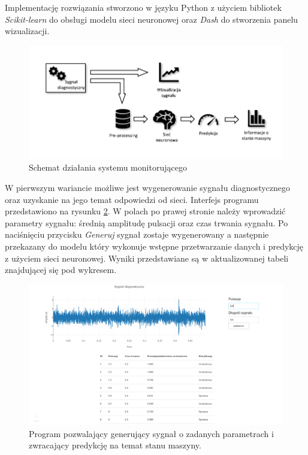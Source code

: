 \documentclass[inzynierska]{pwr_wmat_praca_dyplomowa}
\theoremstyle{plain}
\numberwithin{theorem}{chapter}
\theoremstyle{definition}
\numberwithin{theorem}{chapter}
\begin{document}
Implementację rozwiązania stworzono w języku Python z użyciem bibliotek \textit{Scikit-learn} do obsługi modelu sieci neuronowej oraz \textit{Dash} do stworzenia panelu wizualizacji. 
\begin{figure}[H]
	\centering
	\includegraphics[scale=1.2]{images/monitor_c.pdf}
	\caption{Schemat działania systemu monitorującego}
	\label{monitor}
\end{figure}

W pierwszym wariancie możliwe jest wygenerowanie sygnału diagnostycznego oraz uzyskanie na jego temat odpowiedzi od sieci. Interfejs programu przedstawiono na rysunku \ref{monitor_static}. W polach po prawej stronie należy wprowadzić parametry sygnału: średnią amplitudę pulsacji oraz czas trwania sygnału. Po naciśnięciu przycisku \textit{Generuj} sygnał zostaje wygenerowany a następnie przekazany do modelu który wykonuje wstępne przetwarzanie danych i predykcję z użyciem sieci neuronowej. Wyniki przedstawiane są w aktualizowanej tabeli znajdującej się pod wykresem.
\begin{figure}[H]
	\centering
	\includegraphics[scale=0.4]{images/monitor_static2.png}
	\caption{Program pozwalający generujący sygnał o zadanych parametrach i zwracający predykcję na temat stanu maszyny.}
	\label{monitor_static}
\end{figure}
\end{document}
